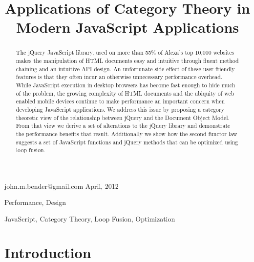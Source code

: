 \documentclass[preprint, leqno]{sigplanconf}
\begin{document}
\copyrightdata{[to be supplied]}


\title{Applications of Category Theory in Modern JavaScript Applications}

           {john.m.bender@gmail.com}
           {April, 2012}

\maketitle

\begin{abstract}
The jQuery JavaScript library, used on more than 55\% of Alexa's top 10,000 websites \cite{bib:usage} makes the manipulation of HTML documents easy and intuitive through fluent method chaining and an intuitive API design. An unfortunate side effect of these user friendly features is that they often incur an otherwise unnecessary performance overhead. While JavaScript execution in desktop browsers has become fast enough to hide much of the problem, the growing complexity of HTML documents and the ubiquity of web enabled mobile devices continue to make performance an important concern when developing JavaScript applications. We address this issue by proposing a category theoretic view of the relationship between jQuery and the Document Object Model. From that view we derive a set of alterations to the jQuery library and demonstrate the performance benefits that result. Additionally we show how the second functor law suggests a set of JavaScript functions and jQuery methods that can be optimized using loop fusion.
\end{abstract}


\terms
Performance, Design

\keywords
JavaScript, Category Theory, Loop Fusion, Optimization

\section{Introduction}
\end{document}
